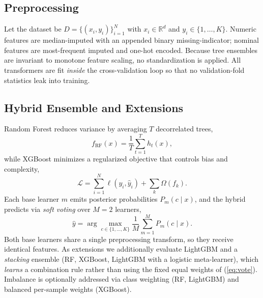 \documentclass[conference]{IEEEtran}
\begin{document}
\subsection{Preprocessing}
Let the dataset be $D=\{(x_i,y_i)\}_{i=1}^{N}$ with $x_i\in\mathbb{R}^d$ and
$y_i\in\{1,\dots,K\}$. Numeric features are median-imputed with an appended binary
missing-indicator; nominal features are most-frequent imputed and one-hot
encoded. Because tree ensembles are invariant to monotone feature scaling, no
standardization is applied. All transformers are fit \emph{inside} the
cross-validation loop so that no validation-fold statistics leak into training.

\subsection{Hybrid Ensemble and Extensions}
Random Forest reduces variance by averaging $T$ decorrelated trees,
\begin{equation}
f_{\mathrm{RF}}(x)=\frac{1}{T}\sum_{t=1}^{T}h_t(x),
\end{equation}
while XGBoost minimizes a regularized objective that controls bias and
complexity,
\begin{equation}
\mathcal{L}=\sum_{i=1}^{N}\ell(y_i,\hat{y}_i)+\sum_{k}\Omega(f_k).
\end{equation}
Each base learner $m$ emits posterior probabilities $P_m(c\mid x)$, and the hybrid
predicts via \emph{soft voting} over $M{=}2$ learners,
\begin{equation}
\hat{y}=\arg\max_{c\in\{1,\dots,K\}}\frac{1}{M}\sum_{m=1}^{M}P_m(c\mid x).
\label{eq:vote}
\end{equation}
Both base learners share a single preprocessing transform, so they receive
identical features. As extensions we additionally evaluate LightGBM and a
\emph{stacking} ensemble (RF, XGBoost, LightGBM with a logistic meta-learner),
which \emph{learns} a combination rule rather than using the fixed equal weights
of (\ref{eq:vote}). Imbalance is optionally addressed via class weighting (RF,
LightGBM) and balanced per-sample weights (XGBoost).
\end{document}
